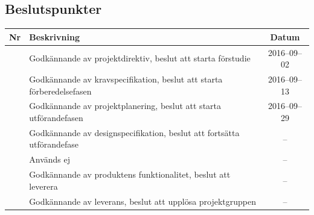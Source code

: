 \documentclass[a4paper,titlepage,12pt]{article}
\newcounter{bpNr}
\newcommand{\nextBPNr}{\stepcounter{bpNr}\arabic{bpNr}}
\begin{document}
	
	\subsection{Beslutspunkter}
	\begin{longtable}[c]{ c l c}
		\textbf{Nr} & \textbf{Beskrivning} & \textbf{Datum} \\ \midrule
		\nextBPNr{} & Godkännande av projektdirektiv, beslut att starta förstudie & 2016--09--02 \\ \midrule
		\nextBPNr{} & Godkännande av kravspecifikation, beslut att starta förberedelsefasen & 2016--09--13 \\ \midrule
		\nextBPNr{} & Godkännande av projektplanering, beslut att starta utförandefasen & 2016--09--29 \\ \midrule
		\nextBPNr{} & Godkännande av designspecifikation, beslut att fortsätta utförandefase & -- \\ \midrule
		\nextBPNr{} & Används ej & -- \\ \midrule
		\nextBPNr{} & Godkännande av produktens funktionalitet, beslut att leverera & -- \\ \midrule
		\nextBPNr{} & Godkännande av leverans, beslut att upplösa projektgruppen & -- \\ \midrule
	\end{longtable}
	
	
\end{document}
